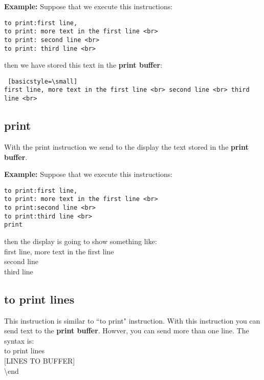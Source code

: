 \documentclass[11pt,a4paper,openright,oneside]{book}
\newenvironment{ex}
{
  \setlength{\parindent}{0cm}
  \large \textbf{Example:} \normalsize 
}
{}
\begin{document}
\begin{ex} Suppose that we execute this instructions:
  \begin{lstlisting}
to print:first line,
to print: more text in the first line <br>
to print: second line <br>
to print: third line <br>
  \end{lstlisting}
then we have stored this text in the \textbf{print buffer}:
  \begin{lstlisting} [basicstyle=\small]
first line, more text in the first line <br> second line <br> third line <br>
  \end{lstlisting}
\end{ex}
  
\subsection{\textsf{print}}

With the \textsf{print} instruction we send to the display the text stored in the \textbf{print buffer}.

\begin{ex} Suppose that we execute this instructions:
  \begin{lstlisting}
to print:first line,
to print: more text in the first line <br>
to print:second line <br>
to print:third line <br>
print
  \end{lstlisting}
then the display is going to show something like: \vspace{5px}\\
\textsf{first line, more text in the first line \\
second line \\
third line \\}
\end{ex}

\subsection{\textsf{to print lines}}

This instruction is similar to ``\textsf{to print}" instruction. With this instruction you can send text to the \textbf{print buffer}. Howver, you can send more than one line. The syntax is:
\vspace{5px}\\
\textsf{to print lines} \\
\textsc{\scriptsize[LINES TO BUFFER]} \\
\textsf{\textbackslash end} \\
\end{document}
